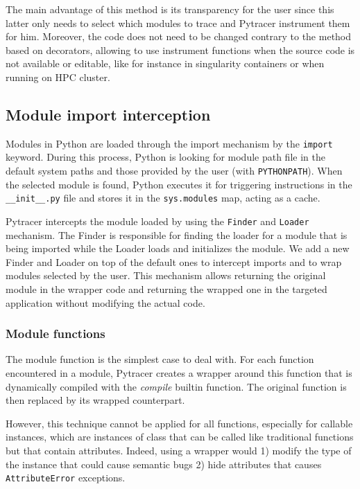\documentclass[11pt]{article}
\begin{document}
The main advantage of this method is its transparency for the user
since this latter only needs to select which modules to trace and Pytracer instrument them for him.
Moreover, the code does not need to be changed contrary to the method based on decorators, allowing
to use instrument functions when the source code is not available or editable, like for instance
in singularity containers or when running on HPC cluster.

\subsection{Module import interception}

Modules in Python are loaded through the import mechanism by the \texttt{import} keyword.
During this process, Python is looking for module path file in the default system paths and those provided by
the user (with \texttt{PYTHONPATH}). When the selected module is found, Python executes it for triggering 
instructions in the \texttt{\_\_init\_\_.py} file and stores it in the \texttt{sys.modules} map,
acting as a cache. 

Pytracer intercepts the module loaded by using the \texttt{Finder} and \texttt{Loader} mechanism.
The Finder is responsible for finding the loader for a module that is being imported while the 
Loader loads and initializes the module. We add a new Finder and Loader on top of the default ones
to intercept imports and to wrap modules selected by the user. This mechanism allows returning 
the original module in the wrapper code and returning the wrapped one in the targeted application
without modifying the actual code.

\subsubsection{Module functions}

The module function is the simplest case to deal with.
For each function encountered in a module, Pytracer
creates a wrapper around this function that is dynamically compiled with the \textit{compile}
builtin function. The original function is then replaced by its wrapped counterpart.

However, this technique cannot be applied for all functions, especially for 
callable instances, which are instances of class that can be called like traditional functions
but that contain attributes. Indeed, using a wrapper would 1) modify the type of the instance
that could cause semantic bugs 2) hide attributes that causes \texttt{AttributeError} exceptions.
\end{document}

